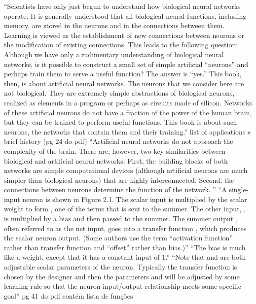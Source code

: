 \documentclass{automatextcc}
\begin{document}
``Scientists have only just begun to understand how biological neural networks operate. It is generally understood that all biological neural functions, including memory, are stored in the neurons and in the connections between them. Learning is viewed as the establishment of new connections between neurons or the modification of existing connections. This leads to the following question: Although we have only a rudimentary understanding of biological neural networks, is it possible to construct a small set of simple artificial “neurons” and perhaps train them to serve a useful function? The answer is “yes.” This book, then, is about artificial neural networks. The neurons that we consider here are not biological. They are extremely simple abstractions of biological neurons, realized as elements in a program or perhaps as circuits made of silicon. Networks of these artificial neurons do not have a fraction of the power of the human brain, but they can be trained to perform useful functions. This book is about such neurons, the networks that contain them and their training.''
list of applications e brief history (pg 24 do pdf)
``Artificial neural networks do not approach the complexity of the brain. There are, however, two key similarities between biological and artificial neural networks. First, the building blocks of both networks are simple computational devices (although artificial neurons are much simpler than biological neurons) that are highly interconnected. Second, the connections between neurons determine the function of the network. ''
``A single-input neuron is shown in Figure 2.1. The scalar input is multiplied by the scalar weight to form , one of the terms that is sent to the summer. The other input, , is multiplied by a bias and then passed to the summer. The summer output , often referred to as the net input, goes into a transfer function , which produces the scalar neuron output. (Some authors use the term “activation function” rather than transfer function and “offset” rather than bias.)''
``The bias is much like a weight, except that it has a constant input of 1.''
``Note that and are both adjustable scalar parameters of the neuron. Typically the transfer function is chosen by the designer and then the parameters and will be adjusted by some learning rule so that the neuron input/output relationship meets some specific goal''
pg 41 do pdf contém lista de funções
\end{document}
